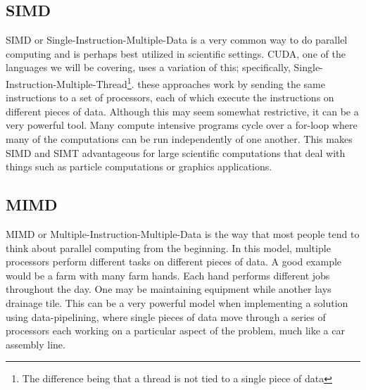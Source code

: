 \documentclass{article}
\newcommand{\comp}[1]{{\ttfamily #1}}
\begin{document}
    \subsection{SIMD}
    SIMD or Single-Instruction-Multiple-Data is a very common way to do parallel computing and is perhaps best utilized in scientific settings. CUDA, one of the languages we will be covering, uses a variation of this; specifically, Single-Instruction-Multiple-Thread\footnote{The difference being that a thread is not tied to a single piece of data}. these approaches work by sending the same instructions to a set of processors, each of which execute the instructions on different pieces of data. Although this may seem somewhat restrictive, it can be a very powerful tool. Many compute intensive programs cycle over a \comp{for}-loop where many of the computations can be run independently of one another. This makes SIMD and SIMT advantageous for large scientific computations that deal with things such as particle computations or graphics applications.
    \subsection{MIMD}
    MIMD or Multiple-Instruction-Multiple-Data is the way that most people tend to think about parallel computing from the beginning. In this model, multiple processors perform different tasks on different pieces of data. A good example would be a farm with many farm hands. Each hand performs different jobs throughout the day. One may be maintaining equipment while another lays drainage tile. This can be a very powerful model when implementing a solution using data-pipelining, where single pieces of data move through a series of processors each working on a particular aspect of the problem, much like a car assembly line.

\end{document}
